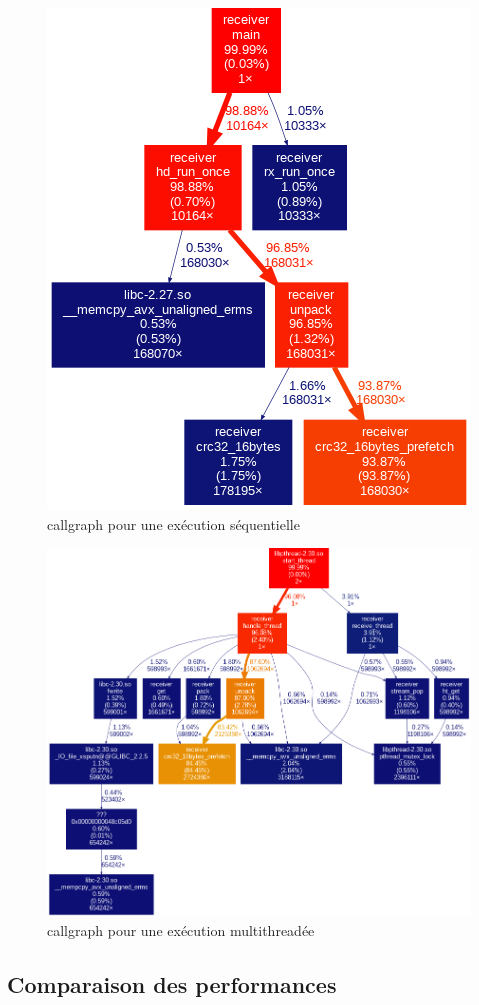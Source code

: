 \documentclass[../main.tex]{subfiles}
\begin{document}
\newpage
\begin{figure}
    \includegraphics[scale=0.6]{assets/callgraph_seq.png}
    \caption{callgraph pour une exécution séquentielle}
\end{figure}

\newpage
\begin{figure}
    \includegraphics[scale=1.2]{assets/callgraph.png}
    \caption{callgraph pour une exécution multithreadée}
\end{figure}

\subsection{Comparaison des performances}

\label{sec:plot_1_recv}

\label{sec:plot_mul_recv}

\label{sec:plot_max}
\end{document}
